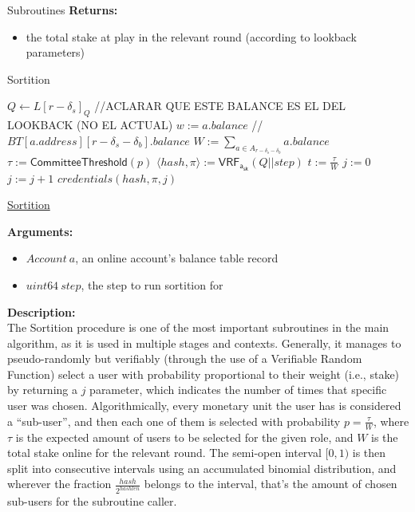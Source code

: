 \documentclass[10pt,a4paper]{article}
\begin{document}
\begin{section}{Subroutines}
\noindent \textbf{Returns:}
\begin{itemize}
    \item the total stake at play in the relevant round (according to lookback parameters)
  \end{itemize}


\begin{algorithm}[H]
    \caption{Sortition}
    \label{algo:sortition}
    \begin{algorithmic}[1]
        \State $Q \gets L[r - \delta_s]_{Q}$
        //ACLARAR QUE ESTE BALANCE ES EL DEL LOOKBACK (NO EL ACTUAL)
        \State $w := a.balance$ //$BT[a.address][r-\delta_s-\delta_b].balance$
        \State $W := \sum_{a \in A_{r-\delta_s-\delta_b}}a.balance$
        \State $\tau := \mathsf{CommitteeThreshold}(p)$
        \State $ \langle hash, \pi \rangle := \mathsf{VRF_{a_{sk}}}(Q||step)$
        \State $t := \frac{\tau}{W}$
        \State $j := 0$
        \While{$\frac{hash}{2^{hashlen}}\notin [ \sum_{k=0}^j\mathsf{B}(k;w,t), \sum_{k=0}^{j+1}\mathsf{B}(k;w,t))$}
            \State $j := j+1$
        \EndWhile
        \Return $credentials(hash, \pi, j)$
    \EndFunction
    \end{algorithmic}
    \caption{\underline{Sortition}}
\end{algorithm}


\noindent \textbf{Arguments:}
\begin{itemize}
    \item $Account \ a$, an online account's balance table record
    \item $uint64 \ step$, the step to run sortition for
\end{itemize}

\noindent \textbf{Description:}\\
The Sortition procedure is one of the most important subroutines in the main algorithm, as it is 
used in multiple stages and contexts.
Generally, it manages to pseudo-randomly but verifiably (through the use of a Verifiable Random 
Function) select a user with probability proportional
to their weight (i.e., stake) by returning a $j$ parameter, which indicates the number of times that 
specific user was chosen.
Algorithmically, every monetary unit the user has is considered a ``sub-user'', and then each one 
of them is selected with probability $p = \frac{\tau}{W}$,
where $\tau$ is the expected amount of users to be selected for the given role, and $W$ is the total
stake online for the relevant round.
The semi-open interval $[0,1)$ is then split into consecutive intervals using an accumulated 
binomial distribution, and wherever the fraction $\frac{hash}{2^{hashlen}}$
belongs to the interval, that's the amount of chosen sub-users for the subroutine caller.\\


\end{section}
\end{document}
